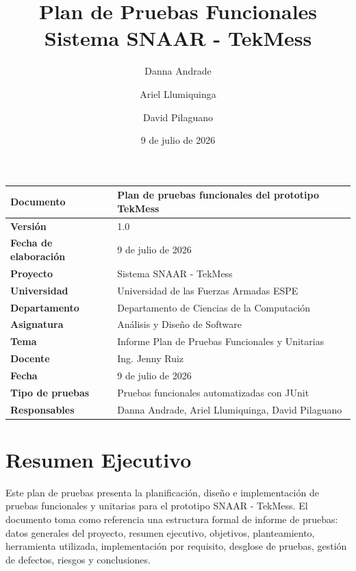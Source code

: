 \documentclass[12pt,a4paper]{article}
\title{\textbf{Plan de Pruebas Funcionales}\\Sistema SNAAR - TekMess}
\author{Danna Andrade \and Ariel Llumiquinga \and David Pilaguano}
\date{9 de julio de 2026}
\begin{document}
\maketitle
\thispagestyle{empty}

\begin{center}
\begin{tabular}{|p{4.5cm}|p{8.5cm}|}
\hline
\rowcolor{grisClaro}
\textbf{Documento} & Plan de pruebas funcionales del prototipo TekMess \\
\hline
\textbf{Versión} & 1.0 \\
\hline
\textbf{Fecha de elaboración} & 9 de julio de 2026 \\
\hline
\textbf{Proyecto} & Sistema SNAAR - TekMess \\
\hline
\textbf{Universidad} & Universidad de las Fuerzas Armadas ESPE \\
\hline
\textbf{Departamento} & Departamento de Ciencias de la Computación \\
\hline
\textbf{Asignatura} & Análisis y Diseño de Software \\
\hline
\textbf{Tema} & Informe Plan de Pruebas Funcionales y Unitarias \\
\hline
\textbf{Docente} & Ing. Jenny Ruiz \\
\hline
\textbf{Fecha} & 9 de julio de 2026 \\
\hline
\textbf{Tipo de pruebas} & Pruebas funcionales automatizadas con JUnit \\
\hline
\textbf{Responsables} & Danna Andrade, Ariel Llumiquinga, David Pilaguano \\
\hline
\end{tabular}
\end{center}

\newpage
\tableofcontents
\newpage

\section*{Resumen Ejecutivo}

Este plan de pruebas presenta la planificación, diseño e implementación de pruebas funcionales y unitarias para el prototipo SNAAR - TekMess. El documento toma como referencia una estructura formal de informe de pruebas: datos generales del proyecto, resumen ejecutivo, objetivos, planteamiento, herramienta utilizada, implementación por requisito, desglose de pruebas, gestión de defectos, riesgos y conclusiones.
\end{document}
